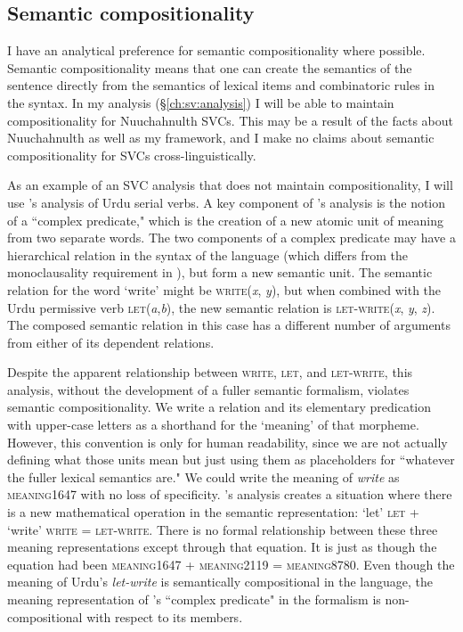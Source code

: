 \subsection{Semantic compositionality} \label{ch:sv:def:compositionality}

I have an analytical preference for semantic compositionality where possible. Semantic compositionality means that one can create the semantics of the sentence directly from the semantics of lexical items and combinatoric rules in the syntax. In my analysis (\S\ref{ch:sv:analysis}) I will be able to maintain compositionality for Nuuchahnulth SVCs. This may be a result of the facts about Nuuchahnulth as well as my framework, and I make no claims about semantic compositionality for SVCs cross-linguistically.

As an example of an SVC analysis that does not maintain compositionality, I will use \citet{butt1995}'s analysis of Urdu serial verbs.  A key component of \citeauthor{butt1995}'s analysis is the notion of a ``complex predicate," which is the creation of a new atomic unit of meaning from two separate words. The two components of a complex predicate may have a hierarchical relation in the syntax of the language (which differs from the monoclausality requirement in \citealt{aikhenvalddixon2006}), but form a new semantic unit. The semantic relation for the word `write' might be \textsc{write}(\textit{x}, \textit{y}), but when combined with the Urdu permissive verb \textsc{let}(\textit{a},\textit{b}), the new semantic relation is \textsc{let-write}(\textit{x}, \textit{y}, \textit{z}). The composed semantic relation in this case has a different number of arguments from either of its dependent relations.

Despite the apparent relationship between \textsc{write}, \textsc{let}, and \textsc{let-write}, this analysis, without the development of a fuller semantic formalism, violates semantic compositionality. We write a relation and its elementary predication with upper-case letters as a shorthand for the `meaning' of that morpheme. However, this convention is only for human readability, since we are not actually defining what those units mean but just using them as placeholders for ``whatever the fuller lexical semantics are." We could write the meaning of \textit{write} as \textsc{meaning1647} with no loss of specificity. \citeauthor{butt1995}'s analysis creates a situation where there is a new mathematical operation in the semantic representation: `let' \textsc{let} + `write' \textsc{write} = \textsc{let-write}. There is no formal relationship between these three meaning representations except through that equation. It is just as though the equation had been \textsc{meaning1647} + \textsc{meaning2119} = \textsc{meaning8780}. Even though the meaning of Urdu's \textit{let-write} is semantically compositional in the language, the meaning representation of \citeauthor{butt1995}'s ``complex predicate" in the formalism is non-compositional with respect to its members.


